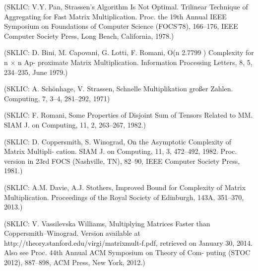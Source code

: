 \documentclass[a4paper,11pt]{article}
\begin{document}
(SKLIC: V.Y. Pan, Strassen’s Algorithm Is Not Optimal. Trilinear Technique of Aggregating for
Fast Matrix Multiplication. Proc. the 19th Annual IEEE Symposium on Foundations of
Computer Science (FOCS’78), 166–176, IEEE Computer Society Press, Long Beach,
California, 1978.)

(SKLIC: D. Bini, M. Capovani, G. Lotti, F. Romani, O(n 2.7799 ) Complexity for n × n Ap-
proximate Matrix Multiplication. Information Processing Letters, 8, 5, 234–235, June
1979.)

(SKLIC: A. Schönhage, V. Strassen, Schnelle Multiplikation großer Zahlen. Computing, 7, 3–4,
281–292, 1971)

(SKLIC: F. Romani, Some Properties of Disjoint Sum of Tensors Related to MM. SIAM J. on
Computing, 11, 2, 263–267, 1982.)

(SKLIC: D. Coppersmith, S. Winograd, On the Asymptotic Complexity of Matrix Multipli-
cation. SIAM J. on Computing, 11, 3, 472–492, 1982. Proc. version in 23rd FOCS
(Nashville, TN), 82–90, IEEE Computer Society Press, 1981.)

(SKLIC: A.M. Davie, A.J. Stothers, Improved Bound for Complexity of Matrix Multiplication.
Proceedings of the Royal Society of Edinburgh, 143A, 351–370, 2013.)

(SKLIC: V. Vassilevska Williams, Multiplying Matrices Faster than Coppersmith–Winograd.
Version available at http://theory.stanford.edu/virgi/matrixmult-f.pdf, retrieved on
January 30, 2014. Also see Proc. 44th Annual ACM Symposium on Theory of Com-
puting (STOC 2012), 887–898, ACM Press, New York, 2012.)
\end{document}

